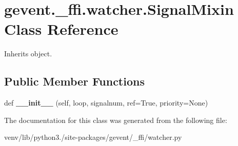 \hypertarget{classgevent_1_1__ffi_1_1watcher_1_1_signal_mixin}{}\section{gevent.\+\_\+ffi.\+watcher.\+Signal\+Mixin Class Reference}
\label{classgevent_1_1__ffi_1_1watcher_1_1_signal_mixin}


Inherits object.

\subsection*{Public Member Functions}
\begin{DoxyCompactItemize}
\item 
\mbox{\label{classgevent_1_1__ffi_1_1watcher_1_1_signal_mixin_ae18f61d4dd73ef831af0280f41d527ae}} 
def {\bfseries \+\_\+\+\_\+init\+\_\+\+\_\+} (self, loop, signalnum, ref=True, priority=None)
\end{DoxyCompactItemize}


The documentation for this class was generated from the following file\+:\begin{DoxyCompactItemize}
\item 
venv/lib/python3./site-\/packages/gevent/\+\_\+ffi/watcher.\+py\end{DoxyCompactItemize}
